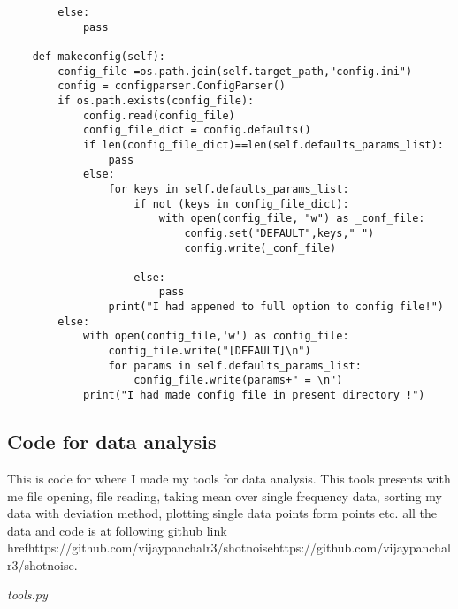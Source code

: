 \documentclass[draft,12pt]{article}
\begin{document}
\begin{verbatim}
        else:
            pass

    def makeconfig(self):
        config_file =os.path.join(self.target_path,"config.ini")
        config = configparser.ConfigParser()
        if os.path.exists(config_file):
            config.read(config_file)
            config_file_dict = config.defaults()
            if len(config_file_dict)==len(self.defaults_params_list):
                pass
            else:
                for keys in self.defaults_params_list:
                    if not (keys in config_file_dict):
                        with open(config_file, "w") as _conf_file: 
                            config.set("DEFAULT",keys," ")
                            config.write(_conf_file)
                            
                    else:
                        pass
                print("I had appened to full option to config file!")
        else:
            with open(config_file,'w') as config_file:
                config_file.write("[DEFAULT]\n")
                for params in self.defaults_params_list:
                    config_file.write(params+" = \n")
            print("I had made config file in present directory !")

\end{verbatim}

            
\subsection*{Code for data analysis}

This is code for where I made my tools for data analysis. This tools presents with me file opening, file reading, taking mean over single frequency data, sorting my data with deviation method, plotting single data points form points etc. all the data and code is at following github link href{https://github.com/vijaypanchalr3/shotnoise}{https://github.com/vijaypanchalr3/shotnoise}. 

\emph{tools.py}
\end{document}
